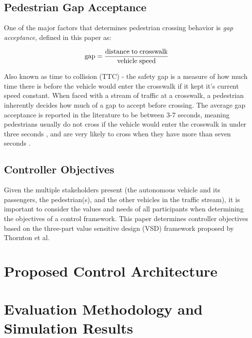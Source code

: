 \documentclass[letterpaper, 10 pt, conference]{ieeeconf}  %
\begin{document}
\subsection{Pedestrian Gap Acceptance}

One of the major factors that determines pedestrian crossing behavior is \textit{gap acceptance}, defined in this paper as:

\begin{align}
\mathrm{gap} = \frac{\mathrm{distance\hspace{1mm}to\hspace{1mm}crosswalk}}{\mathrm{vehicle\hspace{1mm}speed}}
\end{align} 

Also known as time to collision (TTC) - the safety gap is a measure of how much time there is before the vehicle would enter the crosswalk if it kept it's current speed constant. When faced with a stream of traffic at a crosswalk, a pedestrian inherently decides how much of a gap to accept before crossing. The average gap acceptance is reported in the literature to be between 3-7 seconds, meaning pedestrians usually do not cross if the vehicle would enter the crosswalk in under three seconds \cite{DiPietroCharlesMandKing1970}, and are very likely to cross when they have more than seven seconds \cite{Schmidt2009}. 

\subsection{Controller Objectives}

Given the multiple stakeholders present (the autonomous vehicle and its passengers, the pedestrian(s), and the other vehicles in the traffic stream), it is important to consider the values and needs of all participants when determining the objectives of a control framework. This paper determines controller objectives based on the three-part value sensitive design (VSD) framework proposed by Thornton et al. 
\cite{Thornton2018a} 







\section{Proposed Control Architecture}

\section{Evaluation Methodology and Simulation Results}
\end{document}
